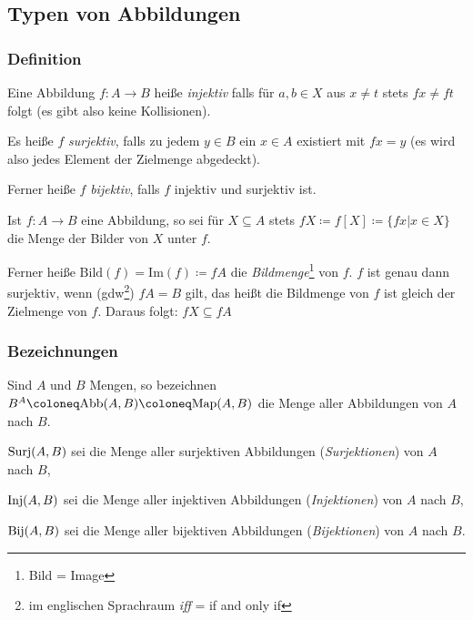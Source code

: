 \subsection{Typen von Abbildungen}\label{kap_typabb}
\subsubsection{Definition}
\begin{description}
\item Eine Abbildung $f \colon A \rightarrow B$ heiße \emph{injektiv} falls für
$a, b \in X$ aus $x \neq t$ stets $fx \neq ft$ folgt (es gibt also keine Kollisionen).
\item Es heiße $f$ \emph{surjektiv}, falls zu jedem $y \in B$ ein $x \in A$
existiert mit $fx = y$ (es wird also jedes Element der Zielmenge abgedeckt).
\item Ferner heiße $f$ \emph{bijektiv}, falls $f$ injektiv und surjektiv ist.
\end{description}
Ist $f \colon A \rightarrow B$ eine Abbildung, so sei für $X \subseteq A$ stets
$fX \coloneq f[X] \coloneq \{fx | x \in X\}$ die Menge der Bilder von $X$ unter
$f$.

Ferner heiße $\text{Bild}(f) = \text{Im}(f) \coloneq fA$ die
\emph{Bildmenge}\footnote{Bild = Image} von $f$. $f$ ist genau dann surjektiv,
wenn (gdw\footnote{im englischen Sprachraum \emph{iff} = if and only if}) $fA = B$
gilt, das heißt die Bildmenge von $f$ ist gleich der Zielmenge von $f$. Daraus
folgt: $fX \subseteq fA$

\subsubsection{Bezeichnungen}
\begin{description}
\item Sind $A$ und $B$ Mengen, so bezeichnen $B^A \coloneq \text{Abb}(A,B)
\coloneq \Map(A,B)$ die Menge aller Abbildungen von $A$ nach $B$.
\item $\text{Surj}(A,B)$ sei die Menge aller surjektiven Abbildungen
(\emph{Surjektionen}) von $A$ nach $B$,
\item $\text{Inj}(A,B)$ sei die Menge aller injektiven Abbildungen
(\emph{Injektionen}) von $A$ nach $B$,
\item $\text{Bij}(A,B)$ sei die Menge aller bijektiven Abbildungen
(\emph{Bijektionen}) von $A$ nach $B$.
\end{description}

